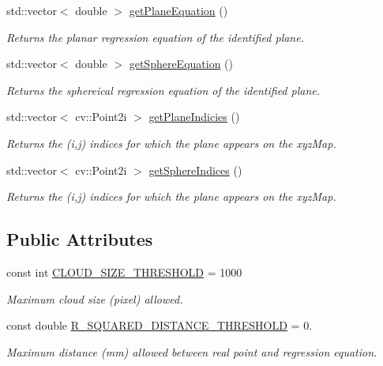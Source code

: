 \begin{DoxyCompactItemize}
std\+::vector$<$ double $>$ \hyperlink{class_plane_aafedb091ba358d46d5203c4e0eb6e838}{get\+Plane\+Equation} ()
\begin{DoxyCompactList}\small\item\em Returns the planar regression equation of the identified plane. \end{DoxyCompactList}\item 
std\+::vector$<$ double $>$ \hyperlink{class_plane_ab82069a9be653b07a589374c03b2f436}{get\+Sphere\+Equation} ()
\begin{DoxyCompactList}\small\item\em Returns the sphereical regression equation of the identified plane. \end{DoxyCompactList}\item 
std\+::vector$<$ cv\+::\+Point2i $>$ \hyperlink{class_plane_a843717e035e2e6b4e03a8eece14098b1}{get\+Plane\+Indicies} ()
\begin{DoxyCompactList}\small\item\em Returns the (i,j) indices for which the plane appears on the xyz\+Map. \end{DoxyCompactList}\item 
std\+::vector$<$ cv\+::\+Point2i $>$ \hyperlink{class_plane_acd72c8d01f393ef78c4ed1f685d1d36d}{get\+Sphere\+Indices} ()
\begin{DoxyCompactList}\small\item\em Returns the (i,j) indices for which the plane appears on the xyz\+Map. \end{DoxyCompactList}\end{DoxyCompactItemize}
\subsection*{Public Attributes}
\begin{DoxyCompactItemize}
\item 
const int \hyperlink{class_plane_a1251f1df31bce7666494bfb6d069dd2e}{C\+L\+O\+U\+D\+\_\+\+S\+I\+Z\+E\+\_\+\+T\+H\+R\+E\+S\+H\+O\+LD} = 1000
\begin{DoxyCompactList}\small\item\em Maximum cloud size (pixel) allowed. \end{DoxyCompactList}\item 
const double \hyperlink{class_plane_ae0e9b28377ab03e577aa6588da269328}{R\+\_\+\+S\+Q\+U\+A\+R\+E\+D\+\_\+\+D\+I\+S\+T\+A\+N\+C\+E\+\_\+\+T\+H\+R\+E\+S\+H\+O\+LD} = 0.
\begin{DoxyCompactList}\small\item\em Maximum distance (mm) allowed between real point and regression equation. \end{DoxyCompactList}\end{DoxyCompactItemize}
